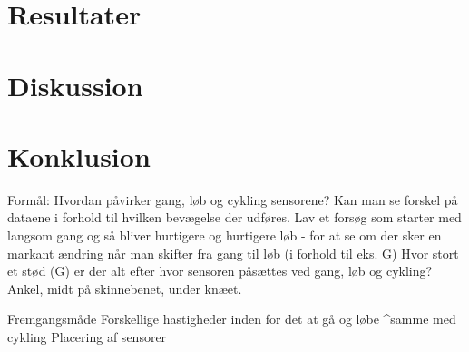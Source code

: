 \section{Resultater}

\section{Diskussion}

\section{Konklusion}

Formål: 
Hvordan påvirker gang, løb og cykling sensorene? 
Kan man se forskel på dataene i forhold til hvilken bevægelse der udføres.
Lav et forsøg som starter med langsom gang og så bliver hurtigere og hurtigere løb - for at se om der sker en markant ændring når man skifter fra gang til løb (i forhold til eks. G)
Hvor stort et stød (G) er der alt efter hvor sensoren påsættes ved gang, løb og cykling?
Ankel, midt på skinnebenet, under knæet.


Fremgangsmåde
Forskellige hastigheder inden for det at gå og løbe 
^samme med cykling
Placering af sensorer
